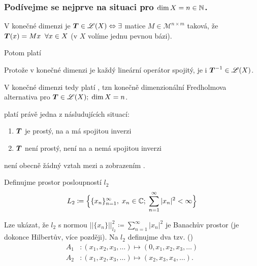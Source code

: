 \subsubsection{Podívejme se nejprve na situaci pro $\dim X=n\in \mathbb{N}$.}

V konečné dimenzi je $ \boldsymbol{T} \in \mathscr{L}(X)\Leftrightarrow \exists$ matice $M\in \mathcal{M}^{n\times m}$ taková, že $ \boldsymbol{T} (x)=Mx \;\;\forall x \in X$ (v $X$ volíme jednu pevnou bázi).

Potom platí 


Protože v konečné dimenzi je každý lineární operátor spojitý, je i $ \boldsymbol{T} ^{-1}\in\mathscr{L}(X)$.

V konečné dimenzi tedy platí , tzn konečně dimenzionální Fredholmova alternativa pro $ \boldsymbol{T} \in\mathscr{L}(X);\;\dim X=n$.

platí právě jedna z násludujících situací:
\begin{enumerate}
    \item $ \boldsymbol{T} $ je prostý, na a má spojitou inverzi
    \item $ \boldsymbol{T} $ není prostý, není na a nemá spojitou inverzi
\end{enumerate}
 není obecně žádný vztah mezi  a zobrazením .

\Priklad

Definujme prostor posloupností $l_2$
$$L_2\coloneqq \Big\{ \{x_n\}_{n=1}^\infty,\; x_n\in\mathbb{C};\;\sum\limits_{n=1}^\infty|x_n|^2<\infty\Big\}$$

Lze ukázat, že $l_2$ s normou $||\{x_n\}||^2_{l_2}\coloneqq \sum_{n=1}^\infty|x_n|^2$ je Banachův prostor (je dokonce Hilbertův, více později). Na $l_2$ definujme dva tzv.  ()
\begin{equation*}
\begin{split}
  A_1&: (x_1,x_2,x_3,\dots)\mapsto (0,x_1,x_2,x_3,\dots)\\
  A_2&: (x_1,x_2,x_3,\dots)\mapsto (x_2,x_3,x_4,\dots).
\end{split}
\end{equation*}

